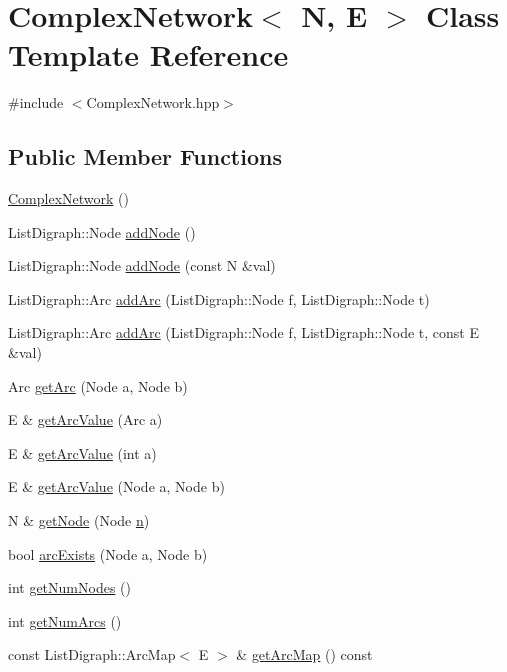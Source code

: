 \hypertarget{class_complex_network}{\section{Complex\+Network$<$ N, E $>$ Class Template Reference}
\label{class_complex_network}
}


{\ttfamily \#include $<$Complex\+Network.\+hpp$>$}

\subsection*{Public Member Functions}
\begin{DoxyCompactItemize}
\item 
\hyperlink{class_complex_network_aeaa6515a7b2b14f58391d3ea96f8ba1c}{Complex\+Network} ()
\item 
List\+Digraph\+::\+Node \hyperlink{class_complex_network_a94dc0dc077369f49fcf6010236c6e461}{add\+Node} ()
\item 
List\+Digraph\+::\+Node \hyperlink{class_complex_network_add76e54a672f7489ec0fc03e720b2040}{add\+Node} (const N \&val)
\item 
List\+Digraph\+::\+Arc \hyperlink{class_complex_network_ad257925d1fe72a1512c43d83a5c02c6c}{add\+Arc} (List\+Digraph\+::\+Node f, List\+Digraph\+::\+Node t)
\item 
List\+Digraph\+::\+Arc \hyperlink{class_complex_network_ac295c2bb486f33b91761f58d727f87ff}{add\+Arc} (List\+Digraph\+::\+Node f, List\+Digraph\+::\+Node t, const E \&val)
\item 
Arc \hyperlink{class_complex_network_a0b8a94ddb234a3be1c8f6395879120ea}{get\+Arc} (Node a, Node b)
\item 
E \& \hyperlink{class_complex_network_acec7daa653363b1a7f7835258eeef198}{get\+Arc\+Value} (Arc a)
\item 
E \& \hyperlink{class_complex_network_a9fcc4be3ca83cd6afb5865bff245321b}{get\+Arc\+Value} (int a)
\item 
E \& \hyperlink{class_complex_network_a2a43744eca534a8b2090ceb11f97be2c}{get\+Arc\+Value} (Node a, Node b)
\item 
N \& \hyperlink{class_complex_network_a2631cf373b8711f9e6ab7fb0636b6f62}{get\+Node} (Node \hyperlink{print_report_8m_aeab71244afb687f16d8c4f5ee9d6ef0e}{n})
\item 
bool \hyperlink{class_complex_network_ac3b0160abb78c53260c9e77dece41b74}{arc\+Exists} (Node a, Node b)
\item 
int \hyperlink{class_complex_network_af82c570ef1bbe0db0751554ed7bec9da}{get\+Num\+Nodes} ()
\item 
int \hyperlink{class_complex_network_aa5810b5e82898b9f7b8ea22d68835bfb}{get\+Num\+Arcs} ()
\item 
const List\+Digraph\+::\+Arc\+Map$<$ E $>$ \& \hyperlink{class_complex_network_a5c67bb0a664e9ffe1607609718f21d16}{get\+Arc\+Map} () const 
\end{DoxyCompactItemize}
